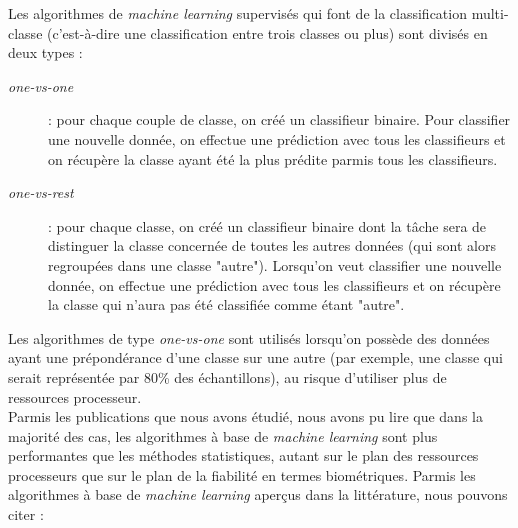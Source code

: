 Les algorithmes de \textit{machine learning} supervisés qui font de la classification multi-classe (c'est-à-dire une classification entre trois classes ou plus) sont divisés en deux types :\\


\begin{description}
  \item[\textit{one-vs-one}] : pour chaque couple de classe, on créé un classifieur binaire. Pour classifier une nouvelle donnée, on effectue une prédiction avec tous les classifieurs et on récupère la classe ayant été la plus prédite parmis tous les classifieurs.
  \item[\textit{one-vs-rest}] : pour chaque classe, on créé un classifieur binaire dont la tâche sera de distinguer la classe concernée de toutes les autres données (qui sont alors regroupées dans une classe "autre"). Lorsqu'on veut classifier une nouvelle donnée, on effectue une prédiction avec tous les classifieurs et on récupère la classe qui n'aura pas été classifiée comme étant "autre".\\
\end{description}

Les algorithmes de type \textit{one-vs-one} sont utilisés lorsqu'on possède des données ayant une prépondérance d'une classe sur une autre (par exemple, une classe qui serait représentée par 80\% des échantillons), au risque d'utiliser plus de ressources processeur.\\

Parmis les publications que nous avons étudié, nous avons pu lire que dans la majorité des cas, les algorithmes à base de \textit{machine learning} sont plus performantes que les méthodes statistiques, autant sur le plan des ressources processeurs\cite{Hu2008} que sur le plan de la fiabilité en termes biométriques\cite{giotBenchmark}. Parmis les algorithmes à base de \textit{machine learning} aperçus dans la littérature, nous pouvons citer :\\

